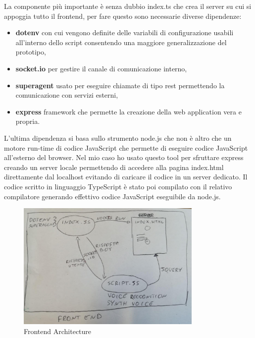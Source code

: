 La componente più importante è senza dubbio index.ts che crea il server su cui si appoggia tutto il frontend, per fare questo sono necessarie diverse dipendenze:
\begin{itemize}
\item \textbf{dotenv} con cui vengono definite delle variabili di configurazione usabili all'interno dello script consentendo una maggiore generalizzazione del prototipo,
\item \textbf{socket.io} per gestire il canale di comunicazione interno,
\item \textbf{superagent} usato per eseguire chiamate di tipo rest permettendo la comunicazione con servizi esterni,
\item  \textbf{express} framework che permette la creazione della web application vera e propria.
\end{itemize}
L'ultima dipendenza si basa sullo strumento node.js che non è altro che un motore run-time di codice JavaScript che permette di eseguire codice JavaScript all'esterno del browser. Nel mio caso ho usato questo tool per sfruttare express creando un server locale permettendo di accedere alla pagina index.html direttamente dal localhost evitando di caricare il codice in un server dedicato.
Il codice scritto in linguaggio TypeScript è stato poi compilato con il relativo compilatore generando effettivo codice JavaScript eseguibile da node.js.
\begin{figure}[H]
 \centering
  \includegraphics[width=0.8\textwidth]{img/frontend.jpg}
 \caption{Frontend Architecture}
\end{figure}

